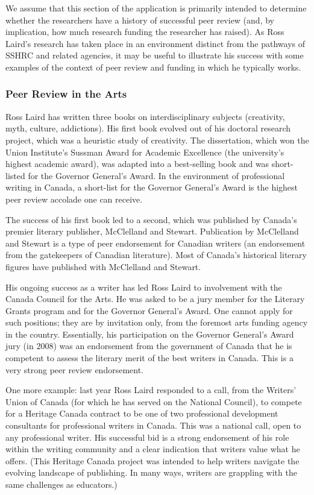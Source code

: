 \documentclass[letterpaper,10pt,headsepline]{scrreprt}
\begin{document}
We assume that this section of the application is primarily intended to
determine whether the researchers have a history of successful peer review
(and, by implication, how much research funding the researcher has raised). As
Ross Laird's research has taken place in an environment distinct from the
pathways of SSHRC and related agencies, it may be useful to illustrate his
success with some examples of the context of peer review and funding in which
he typically works.

\subsubsection{Peer Review in the Arts}

Ross Laird has written three books on interdisciplinary subjects (creativity,
myth, culture, addictions). His first book evolved out of his doctoral
research project, which was a heuristic study of creativity. The dissertation,
which won the Union Institute's Sussman Award for Academic Excellence (the
university's highest academic award), was adapted into a best-selling book and
was short-listed for the Governor General's Award. In the environment of
professional writing in Canada, a short-list for the Governor General's Award
is the highest peer review accolade one can receive.

The success of his first book led to a second, which was published by Canada's
premier literary publisher, McClelland and Stewart. Publication by McClelland
and Stewart is a type of peer endorsement for Canadian writers (an endorsement
from the gatekeepers of Canadian literature). Most of Canada's historical
literary figures have published with McClelland and Stewart.

His ongoing success as a writer has led Ross Laird to involvement with the
Canada Council for the Arts. He was asked to be a jury member for the Literary
Grants program and for the Governor General's Award. One cannot apply for such
positions; they are by invitation only, from the foremost arts funding agency
in the country. Essentially, his participation on the Governor General's Award
jury (in 2008) was an endorsement from the government of Canada that he is
competent to assess the literary merit of the best writers in Canada. This is
a very strong peer review endorsement.

One more example: last year Ross Laird responded to a call, from the Writers'
Union of Canada (for which he has served on the National Council), to compete
for a Heritage Canada contract to be one of two professional development
consultants for professional writers in Canada. This was a national call, open
to any professional writer. His successful bid is a strong endorsement of his
role within the writing community and a clear indication that writers value
what he offers. (This Heritage Canada project was intended to help writers
navigate the evolving landscape of publishing. In many ways, writers are
grappling with the same challenges as educators.)
\end{document}
